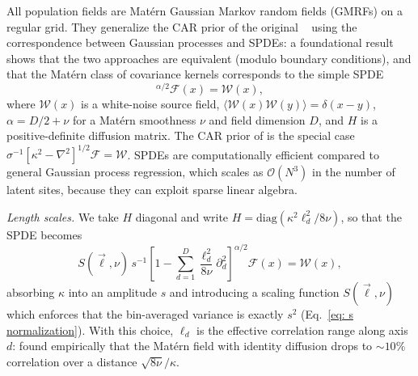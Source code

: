 
All population fields are Mat\'ern Gaussian Markov random fields (\acp{GMRF}) on a regular grid. They generalize the \ac{CAR} prior of the original \PixelPop~\cite{Heinzel:2024jlc} using the correspondence between Gaussian processes and \acp{SPDE}: a foundational result~\cite{Whittle:1954abc, Whittle:1963abc, lindgren_explicit_2011} shows that the two approaches are equivalent (modulo boundary conditions), and that the Mat\'ern class of covariance kernels corresponds to the simple \ac{SPDE}
\begin{equation}
    [\kappa^2 - \nabla\cdot (H\nabla)]^{\alpha/2} \mathcal{F}(x) = \mathcal{W}(x),
    \label{eq: lrl spde}
\end{equation}
where $\mathcal{W}(x)$ is a white-noise source field, $\langle \mathcal{W}(x)\mathcal{W}(y)\rangle = \delta(x-y)$, $\alpha = D/2 + \nu$ for a Mat\'ern smoothness $\nu$ and field dimension $D$, and $H$ is a positive-definite diffusion matrix. The \ac{CAR} prior of \PixelPop is the special case $\sigma^{-1}[\kappa^2 - \nabla^2]^{1/2} \mathcal{F} = \mathcal{W}$. \acp{SPDE} are computationally efficient compared to general Gaussian process regression, which scales as $\mathcal{O}(N^3)$ in the number of latent sites, because they can exploit sparse linear algebra.

\textit{Length scales.} We take $H$ diagonal and write $H = \mathrm{diag}(\kappa^2\ell_d^2/8\nu)$, so that the \ac{SPDE} becomes
\begin{equation}
    S(\vec{\ell},\nu)\, s^{-1}\left[1 - \sum_{d=1}^D\frac{\ell_d^2}{8\nu}\partial_d^2\right]^{\alpha/2} \mathcal{F}(x) = \mathcal{W}(x),
    \label{eq: lrl spde reformated}
\end{equation}
absorbing $\kappa$ into an amplitude $s$ and introducing a scaling function $S(\vec{\ell},\nu)$ which enforces that the bin-averaged variance is exactly $s^2$ (Eq.~\ref{eq: s normalization}). With this choice, $\ell_d$ is the effective correlation range along axis $d$: \citet{lindgren_explicit_2011} found empirically that the Mat\'ern field with identity diffusion drops to $\sim 10\%$ correlation over a distance $\sqrt{8\nu}/\kappa$.

